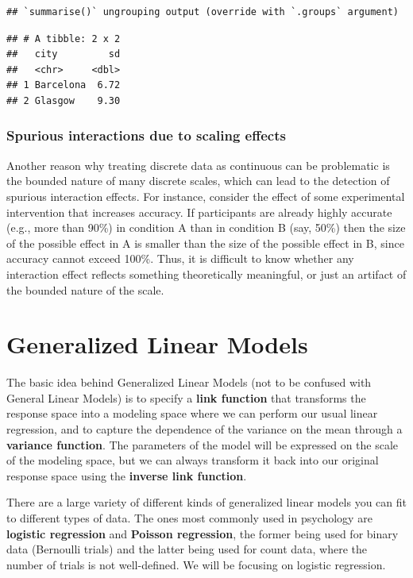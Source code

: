 \documentclass[]{book}
\begin{document}
\begin{verbatim}
## `summarise()` ungrouping output (override with `.groups` argument)
\end{verbatim}

\begin{verbatim}
## # A tibble: 2 x 2
##   city         sd
##   <chr>     <dbl>
## 1 Barcelona  6.72
## 2 Glasgow    9.30
\end{verbatim}

\hypertarget{spurious-interactions-due-to-scaling-effects}{%
\subsubsection{Spurious interactions due to scaling effects}\label{spurious-interactions-due-to-scaling-effects}}

Another reason why treating discrete data as continuous can be problematic is the bounded nature of many discrete scales, which can lead to the detection of spurious interaction effects. For instance, consider the effect of some experimental intervention that increases accuracy. If participants are already highly accurate (e.g., more than 90\%) in condition A than in condition B (say, 50\%) then the size of the possible effect in A is smaller than the size of the possible effect in B, since accuracy cannot exceed 100\%. Thus, it is difficult to know whether any interaction effect reflects something theoretically meaningful, or just an artifact of the bounded nature of the scale.

\hypertarget{generalized-linear-models}{%
\section{Generalized Linear Models}\label{generalized-linear-models}}

The basic idea behind Generalized Linear Models (not to be confused with General Linear Models) is to specify a \textbf{link function} that transforms the response space into a modeling space where we can perform our usual linear regression, and to capture the dependence of the variance on the mean through a \textbf{variance function}. The parameters of the model will be expressed on the scale of the modeling space, but we can always transform it back into our original response space using the \textbf{inverse link function}.

There are a large variety of different kinds of generalized linear models you can fit to different types of data. The ones most commonly used in psychology are \textbf{logistic regression} and \textbf{Poisson regression}, the former being used for binary data (Bernoulli trials) and the latter being used for count data, where the number of trials is not well-defined. We will be focusing on logistic regression.
\end{document}
